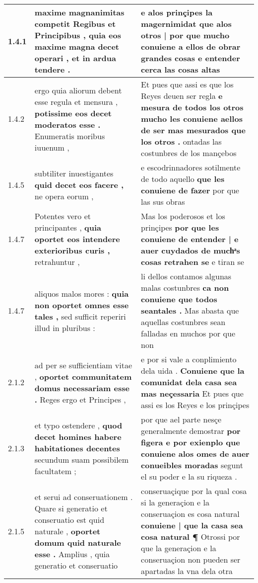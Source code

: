\begin{tabular}{|p{1cm}|p{6.5cm}|p{6.5cm}|}
1.4.1 & maxime magnanimitas competit Regibus et Principibus , \textbf{ quia eos maxime magna decet operari , } et in ardua tendere . & e alos prinçipes la magernimidat \textbf{ que alos otros | por que mucho conuiene a ellos de obrar grandes cosas } e entender cerca las cosas altas \\\hline
1.4.2 & ergo quia aliorum debent esse regula et mensura , \textbf{ potissime eos decet moderatos esse . } Enumeratis moribus iuuenum , & Et pues que assi es que los Reyes deuen ser regla \textbf{ e mesura de todos los otros mucho les conuiene aellos de ser mas mesurados que los otros . } ontadas las costunbres de los mançebos \\\hline
1.4.5 & subtiliter inuestigantes \textbf{ quid decet eos facere , } ne opera eorum , & e escodrinnadores sotilmente de todo aquello \textbf{ que les conuiene de fazer } por que las sus obras \\\hline
1.4.7 & Potentes vero et principantes , \textbf{ quia oportet eos intendere exterioribus curis , } retrahuntur , & Mas los poderosos et los prinçipes \textbf{ por que les conuiene de entender | e auer cuydados de muchͣs cosas retrahen se } e tiran se \\\hline
1.4.7 & aliquos malos mores : \textbf{ quia non oportet omnes esse tales , } sed sufficit reperiri illud in pluribus : & li dellos contamos algunas malas costunbres \textbf{ ca non conuiene que todos seantales . } Mas abasta que aquellas costunbres sean falladas en muchos por que non \\\hline
2.1.2 & ad per se sufficientiam vitae , \textbf{ oportet communitatem domus necessariam esse . } Reges ergo et Principes , & e por si vale a conplimiento dela uida . \textbf{ Conuiene que la comunidat dela casa sea mas neçessaria } Et pues que assi es los Reyes e los prinçipes \\\hline
2.1.3 & et typo ostendere , \textbf{ quod decet homines habere habitationes decentes } secundum suam possibilem facultatem ; & por que ael parte nesçe generalmente demostrar \textbf{ por figera e por exienplo que conuiene alos omes de auer conueibles moradas } segunt el su poder e la su riqueza . \\\hline
2.1.5 & et serui ad conseruationem . Quare si generatio et conseruatio est quid naturale , \textbf{ oportet domum quid naturale esse . } Amplius , quia generatio et conseruatio & conseruaçique por la qual cosa si la generaçion e la conseruaçion es cosa natural \textbf{ conuiene | que la casa sea cosa natural ¶ } Otrossi por que la generaçion e la conseruaçion non pueden ser apartadas la vna dela otra \\\hline

\end{tabular}
